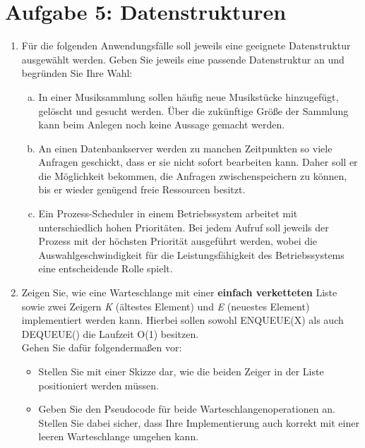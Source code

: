 \documentclass{scrartcl}
\begin{document}
\section*{Aufgabe 5: Datenstrukturen}
\begin{enumerate}[(1)]
\item Für die folgenden Anwendungsfälle soll jeweils eine geeignete Datenstruktur ausgewählt werden. Geben Sie jeweils eine passende Datenstruktur an und begründen Sie Ihre Wahl:
\begin{enumerate}[(a)]
\item In einer Musiksammlung sollen häufig neue Musikstücke hinzugefügt, gelöscht und gesucht werden. Über die zukünftige Größe der Sammlung kann beim Anlegen noch keine Aussage gemacht werden.
\item An einen Datenbankserver werden zu manchen Zeitpunkten so viele Anfragen geschickt, dass er sie nicht sofort bearbeiten kann. Daher soll er die Möglichkeit bekommen, die Anfragen zwischenspeichern zu können, bis er wieder genügend freie Ressourcen besitzt.
\item Ein Prozess-Scheduler in einem Betriebssystem arbeitet mit unterschiedlich hohen Prioritäten. Bei jedem Aufruf soll jeweils der Prozess mit der höchsten Priorität ausgeführt werden, wobei die Auswahlgeschwindigkeit für die Leistungsfähigkeit des Betriebssystems eine entscheidende Rolle spielt.
\end{enumerate}

\item Zeigen Sie, wie eine Warteschlange mit einer \textbf{einfach verketteten} Liste sowie zwei Zeigern \textit{K} (ältestes Element) und \textit{E} (neuestes Element) implementiert werden kann. Hierbei sollen sowohl ENQUEUE(X) als auch DEQUEUE() die Laufzeit O(1) besitzen.\\
Gehen Sie dafür folgendermaßen vor:\\
\begin{itemize}
	\item Stellen Sie mit einer Skizze dar, wie die beiden Zeiger in der Liste positioniert werden müssen.
	\item Geben Sie den Pseudocode für beide Warteschlangenoperationen an. Stellen  Sie dabei sicher, dass Ihre Implementierung auch korrekt mit einer leeren Warteschlange umgehen kann.
\end{itemize}

\end{enumerate}
\end{document}
